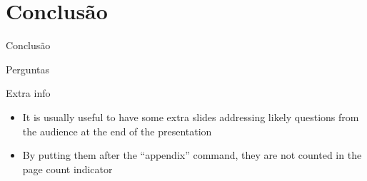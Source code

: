 \documentclass[xcolor={usenames,svgnames,dvipsnames},brazil,english,12pt,aspectratio=149]{beamer}
\begin{document}
\section{Conclusão}

\begin{frame}{Conclusão}
\end{frame}

\begin{frame}{Perguntas}
  \tableofcontents
\end{frame}

\appendix

\begin{frame}{Extra info}
  \begin{itemize}
    \item It is usually useful to have some extra slides addressing likely questions from the audience at the end of the presentation
    \item By putting them after the ``appendix'' command, they are not counted in the page count indicator
  \end{itemize}
\end{frame}
\end{document}
